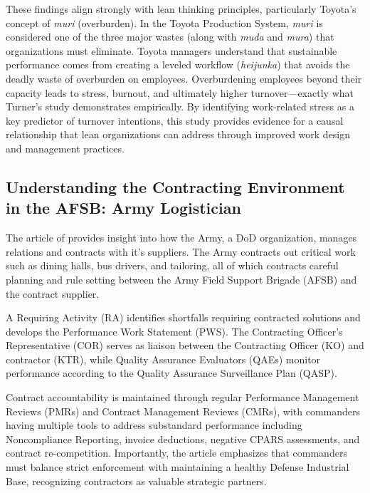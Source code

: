 \documentclass{article}
\begin{document}
			These findings align strongly with lean thinking principles, particularly Toyota's concept of \textit{muri} (overburden). 
			In the Toyota Production System, \textit{muri} is considered one of the three major wastes (along with \textit{muda} and \textit{mura}) that organizations must eliminate.
			Toyota managers understand that sustainable performance comes from creating a leveled workflow (\textit{heijunka}) that avoids the deadly waste of overburden on employees. 
			Overburdening employees beyond their capacity leads to stress, burnout, and ultimately higher turnover—exactly what Turner's study demonstrates empirically. 
			By identifying work-related stress as a key predictor of turnover intentions, this study provides evidence for a causal relationship that lean organizations can address through improved work design and management practices.


		\subsection{Understanding the Contracting Environment in the AFSB: Army Logistician \cite{Carlstedt2020}}

			The article of \cite{Carlstedt2020} provides insight into how the Army, a DoD organization, manages relations and contracts with it's suppliers.
			The Army contracts out critical work such as dining halls, bus drivers, and tailoring, all of which contracts careful planning and rule setting between the Army Field Support Brigade (AFSB) and the contract supplier. 

			A Requiring Activity (RA) identifies shortfalls requiring contracted solutions and develops the Performance Work Statement (PWS). 
			The Contracting Officer's Representative (COR) serves as liaison between the Contracting Officer (KO) and contractor (KTR), while Quality Assurance Evaluators (QAEs) monitor performance according to the Quality Assurance Surveillance Plan (QASP). 

			Contract accountability is maintained through regular Performance Management Reviews (PMRs) and Contract Management Reviews (CMRs), with commanders having multiple tools to address substandard performance including Noncompliance Reporting, invoice deductions, negative CPARS assessments, and contract re-competition. 
			Importantly, the article emphasizes that commanders must balance strict enforcement with maintaining a healthy Defense Industrial Base, recognizing contractors as valuable strategic partners.
\end{document}
